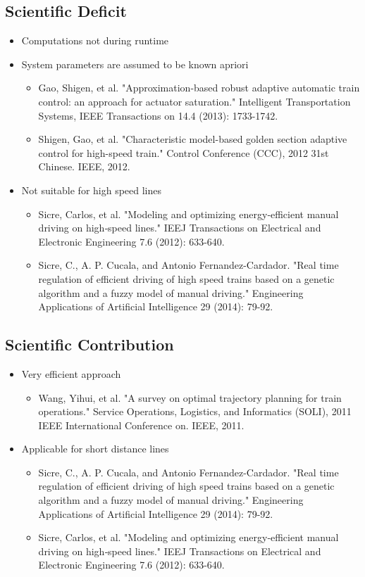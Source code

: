 \documentclass[paper=a4, fontsize=11pt]{scrartcl} %
\numberwithin{equation}{section} %
\numberwithin{figure}{section} %
\numberwithin{table}{section} %
\begin{document}
\subsection{Scientific Deficit}
\begin{itemize}
	\item Computations not during runtime
	\item System parameters are assumed to be known apriori
	\begin{itemize}
		\item Gao, Shigen, et al. "Approximation-based robust adaptive automatic train control: an approach for actuator saturation." Intelligent Transportation Systems, IEEE Transactions on 14.4 (2013): 1733-1742.
		\item Shigen, Gao, et al. "Characteristic model-based golden section adaptive control for high-speed train." Control Conference (CCC), 2012 31st Chinese. IEEE, 2012.
	\end{itemize}
	\item Not suitable for high speed lines
	\begin{itemize}
		\item Sicre, Carlos, et al. "Modeling and optimizing energy‐efficient manual driving on high‐speed lines." IEEJ Transactions on Electrical and Electronic Engineering 7.6 (2012): 633-640.
		\item Sicre, C., A. P. Cucala, and Antonio Fernandez-Cardador. "Real time regulation of efficient driving of high speed trains based on a genetic algorithm and a fuzzy model of manual driving." Engineering Applications of Artificial Intelligence 29 (2014): 79-92.
	\end{itemize}

\end{itemize}

\subsection{Scientific Contribution}
\begin{itemize}
	\item Very efficient approach
	\begin{itemize}
		\item Wang, Yihui, et al. "A survey on optimal trajectory planning for train operations." Service Operations, Logistics, and Informatics (SOLI), 2011 IEEE International Conference on. IEEE, 2011.
	\end{itemize}
	\item Applicable for short distance lines
	\begin{itemize}
		\item Sicre, C., A. P. Cucala, and Antonio Fernandez-Cardador. "Real time regulation of efficient driving of high speed trains based on a genetic algorithm and a fuzzy model of manual driving." Engineering Applications of Artificial Intelligence 29 (2014): 79-92.
		\item Sicre, Carlos, et al. "Modeling and optimizing energy‐efficient manual driving on high‐speed lines." IEEJ Transactions on Electrical and Electronic Engineering 7.6 (2012): 633-640.
	\end{itemize}
\end{itemize}
\end{document}
